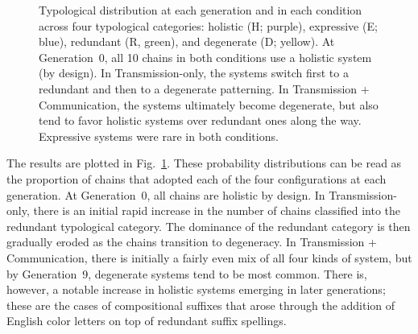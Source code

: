 \documentclass[doc,biblatex]{apa7}
\begin{document}
	\begin{figure}
	\vspace*{2pt}
	\caption{Typological distribution at each generation and in each condition across four typological categories: holistic (H; purple), expressive (E; blue), redundant (R, green), and degenerate (D; yellow). At Generation~0, all 10 chains in both conditions use a holistic system (by design). In Transmission-only, the systems switch first to a redundant and then to a degenerate patterning. In Transmission + Communication, the systems ultimately become degenerate, but also tend to favor holistic systems over redundant ones along the way. Expressive systems were rare in both conditions.}
	\label{typ_dist_dif}
	\end{figure}

The results are plotted in Fig.~\ref{typ_dist_dif}. These probability distributions can be read as the proportion of chains that adopted each of the four configurations at each generation. At Generation~0, all chains are holistic by design. In Transmission-only, there is an initial rapid increase in the number of chains classified into the redundant typological category. The dominance of the redundant category is then gradually eroded as the chains transition to degeneracy. In Transmission + Communication, there is initially a fairly even mix of all four kinds of system, but by Generation~9, degenerate systems tend to be most common. There is, however, a notable increase in holistic systems emerging in later generations; these are the cases of compositional suffixes that arose through the addition of English color letters on top of redundant suffix spellings.
\end{document}
